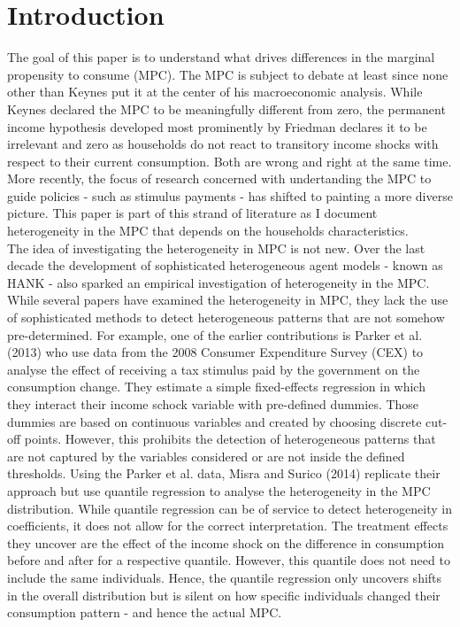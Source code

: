 \section*{Introduction}
The goal of this paper is to understand what drives differences in the marginal propensity to consume (MPC). The MPC is subject to debate at least since none other than Keynes put it at the center of his macroeconomic analysis. While Keynes declared the MPC to be meaningfully different from zero, the permanent income hypothesis developed most prominently by Friedman declares it to be irrelevant and zero as households do not react to transitory income shocks with respect to their current consumption. Both are wrong and right at the same time. More recently, the focus of research concerned with undertanding the MPC to guide policies - such as stimulus payments - has shifted to painting a more diverse picture. This paper is part of this strand of literature as I document heterogeneity in the MPC that depends on the households characteristics. \\
The idea of investigating the heterogeneity in MPC is not new. Over the last decade the development of sophisticated heterogeneous agent models - known as HANK - also sparked an empirical investigation of heterogeneity in the MPC. 
While several papers have examined the heterogeneity in MPC, they lack the use of sophisticated methods to detect heterogeneous patterns that are not somehow pre-determined. For example, one of the earlier contributions is Parker et al. (2013) who use data from the 2008 Consumer Expenditure Survey (CEX) to analyse the effect of receiving a tax stimulus paid by the government on the consumption change.
They estimate a simple fixed-effects regression in which they interact their income schock variable with pre-defined dummies. Those dummies are based on continuous variables and created by choosing discrete cut-off points. However, this prohibits the detection of heterogeneous patterns that are not captured by the variables considered or are not inside the defined thresholds. Using the Parker et al. data, Misra and Surico (2014) replicate their approach but use quantile regression to analyse the heterogeneity in the MPC distribution. While quantile regression can be of service to detect heterogeneity in coefficients, it does not allow for the correct interpretation. The treatment effects they uncover are the effect of the income shock on the difference in consumption before and after for a respective quantile. However, this quantile does not need to include the same individuals. Hence, the quantile regression only uncovers shifts in the overall distribution but is silent on how specific individuals changed their consumption pattern - and hence the actual MPC. \\
